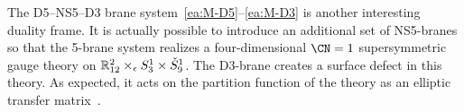The D5--NS5--D3 brane system~\eqref{ea:M-D5}--\eqref{ea:M-D3} is
another interesting duality frame.  It is actually possible to
introduce an additional set of NS5-branes so that the 5-brane system
realizes a four-dimensional $\CN = 1$ supersymmetric gauge theory on
$\mathbb{R}^2_{12} \times_\epsilon S^1_3 \times \check S^1_9$.  The D3-brane
creates a surface defect in this theory.  As expected, it acts on the
partition function of the theory as an elliptic transfer
matrix~\cite{Maruyoshi:2016caf,Yagi:2017hmj}.








